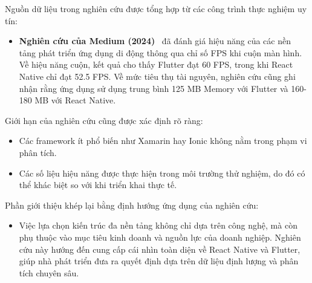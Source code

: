     Nguồn dữ liệu trong nghiên cứu được tổng hợp từ các công trình thực nghiệm uy tín:
    \setlength{\leftmargini}{1.0cm}
    \begin{itemize}
        \item \textbf{Nghiên cứu của Medium (2024)}~\cite{wenhao2018} đã đánh giá hiệu năng của các nền tảng phát triển ứng dụng di động thông qua chỉ số FPS khi cuộn màn hình.
Về hiệu năng cuộn, kết quả cho thấy Flutter đạt 60 FPS, trong khi React Native chỉ đạt 52.5 FPS.
Về mức tiêu thụ tài nguyên, nghiên cứu cũng ghi nhận rằng ứng dụng sử dụng trung bình 125 MB Memory với Flutter và 160-180 MB với React Native.
    \end{itemize}
\vspace{0.5em}


    Giới hạn của nghiên cứu cũng được xác định rõ ràng:
    \setlength{\leftmargini}{1.0cm}
    \begin{itemize}
        \item Các framework ít phổ biến như Xamarin hay Ionic không nằm trong phạm vi phân tích.
        \item Các số liệu hiệu năng được thực hiện trong môi trường thử nghiệm, do đó có thể khác biệt so với khi triển khai thực tế.
    \end{itemize}
\vspace{0.5em}


    Phần giới thiệu khép lại bằng định hướng ứng dụng của nghiên cứu:
    \setlength{\leftmargini}{1.0cm}
    \begin{itemize}
        \item Việc lựa chọn kiến trúc đa nền tảng không chỉ dựa trên công nghệ, mà còn phụ thuộc vào mục tiêu kinh doanh và nguồn lực của doanh nghiệp. Nghiên cứu này hướng đến cung cấp cái nhìn toàn diện về React Native và Flutter, giúp nhà phát triển đưa ra quyết định dựa trên dữ liệu định lượng và phân tích chuyên sâu.
    \end{itemize}
